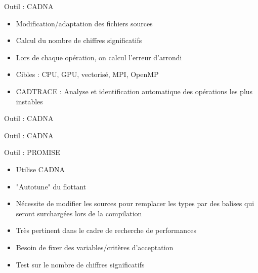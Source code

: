\documentclass{beamer}
\begin{document}
    \begin{frame}{Outil : CADNA}
    \begin{itemize}
    \item Modification/adaptation des fichiers sources
    \item Calcul du nombre de chiffres significatifs
    \item Lors de chaque opération, on calcul l'erreur d'arrondi
    \item Cibles : CPU, GPU, vectorisé, MPI, OpenMP
    \item CADTRACE : Analyse et identification automatique des opérations les plus instables
    \end{itemize}
  \end{frame}
  
  
  \begin{frame}{Outil : CADNA}
\cadnanosample
  \end{frame}
  

    \begin{frame}{Outil : CADNA}
\cadnasample
  \end{frame}
  
    \begin{frame}{Outil : PROMISE}
        \begin{itemize}
    \item Utilise CADNA
    \item "Autotune" du flottant
    \item Nécessite de modifier les sources pour remplacer les types par des balises qui seront surchargées lors de la compilation
    \item Très pertinent dans le cadre de recherche de performances
    \item Besoin de fixer des variables/critères d'acceptation
    \item Test sur le nombre de chiffres significatifs
    \end{itemize}
  \end{frame}
\end{document}
